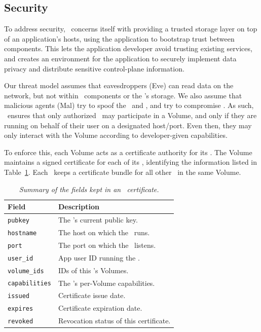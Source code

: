 \subsection{Security}
\label{sec:security}

To address security, \Syndicate\ concerns itself with providing
a trusted storage layer on top of an application's hosts,
using the application to bootstrap trust between components.  This 
lets the application developer avoid trusting existing services,
and creates an environment for the application to securely implement 
data privacy and distribute sensitive control-plane information.

Our threat model assumes that eavesdroppers (Eve) can read data on the network, but not 
within \Syndicate\ components or the \MS's storage.  We also assume that malicious 
agents (Mal) try to spoof the \MS\ and \SGs, and try to compromise \SGs.
As such, \Syndicate\ ensures that only authorized \SGs\ may participate
in a Volume, and only if they are running on behalf of their user on
a designated host/port.  Even then, they may only interact with
the Volume according to developer-given capabilities.

To enforce this, each Volume acts as a certificate authority for
its \SGs.  The Volume maintains a signed certificate for each of its \SGs, identifying
the information listed in Table~\ref{tab:sg-cert}.  Each \SG\ 
keeps a certificate bundle for all other \SGs\ in the same Volume.

\begin{table}[ht!]
\begin{tabular}{ | l | p{5cm} |}
\hline
\textbf{Field} & \textbf{Description} \\
\hline
\texttt{pubkey} & The \SG's current public key.\\
\texttt{hostname} & The host on which the \SG\ runs. \\
\texttt{port} & The port on which the \SG\ listens. \\
\texttt{user\_id}  & App user ID running the \SG. \\
\texttt{volume\_ids} & IDs of this \SG's Volumes.  \\
\texttt{capabilities} & The \SG's per-Volume capabilities. \\
\texttt{issued} & Certificate issue date. \\
\texttt{expires} & Certificate expiration date. \\
\texttt{revoked} & Revocation status of this certificate. \\
\hline
\end{tabular}
\caption{\it Summary of the fields kept in an \SG\ certificate.}
\label{tab:sg-cert}
\end{table}


